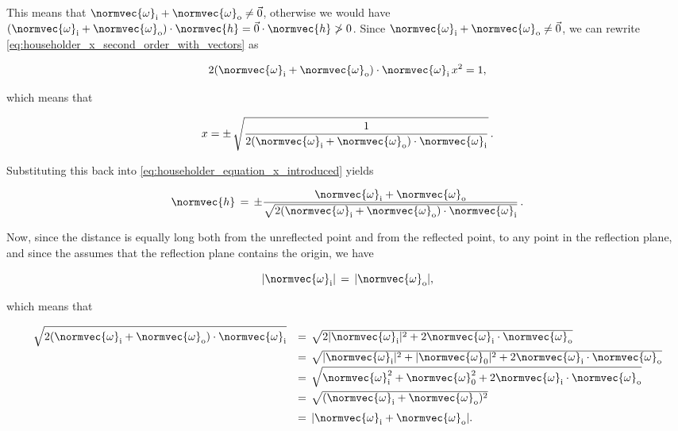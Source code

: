 This means that $\normvec{\omega}_{\text{i}} + \normvec{\omega}_{\text{o}} \neq \vec{0}$, otherwise we would have $(\normvec{\omega}_{\text{i}} + \normvec{\omega}_{\text{o}})\cdot\normvec{h} = \vec{0}\cdot\normvec{h} \not > 0$. Since $\normvec{\omega}_{\text{i}} + \normvec{\omega}_{\text{o}} \neq \vec{0}$, we can rewrite \eqref{eq:householder_x_second_order_with_vectors} as

\begin{equation}
2(\normvec{\omega}_{\text{i}} + \normvec{\omega}_{\text{o}})\cdot\normvec{\omega}_{\text{i}}\,x^2 = 1,
\end{equation}

which means that

\begin{equation}
x = \pm\,\sqrt{\frac{1}{2(\normvec{\omega}_{\text{i}} + \normvec{\omega}_{\text{o}})\cdot\normvec{\omega}_{\text{i}}}}\,.
\end{equation}

Substituting this back into \eqref{eq:householder_equation_x_introduced} yields

\begin{equation} \label{eq:householder_equation_x_replaced}
\normvec{h} \,=\, \pm\frac{\normvec{\omega}_{\text{i}} + \normvec{\omega}_{\text{o}}}{\sqrt{2(\normvec{\omega}_{\text{i}} + \normvec{\omega}_{\text{o}})\cdot\normvec{\omega}_{\text{i}}}}\,.
\end{equation}

Now, since the distance is equally long both from the unreflected point and from the reflected point, to any point in the reflection plane, and since the  assumes that the reflection plane contains the origin, we have

\begin{equation}
|\normvec{\omega}_{\text{i}}| \,=\, |\normvec{\omega}_{\text{o}}|,
\end{equation}

which means that

\begin{equation}
\renewcommand*{\arraystretch}{1.5}
\begin{array}{rl}
\displaystyle \sqrt{2(\normvec{\omega}_{\text{i}} + \normvec{\omega}_{\text{o}})\cdot\normvec{\omega}_{\text{i}}} & =\, \sqrt{2|\normvec{\omega}_{\text{i}}|^2 + 2\normvec{\omega}_{\text{i}}\cdot \normvec{\omega}_{\text{o}}} \\
\displaystyle & =\, \sqrt{|\normvec{\omega}_{\text{i}}|^2 + |\normvec{\omega}_{\text{0}}|^2 + 2\normvec{\omega}_{\text{i}}\cdot \normvec{\omega}_{\text{o}}} \\
\displaystyle & =\, \sqrt{\normvec{\omega}_{\text{i}}^2 + \normvec{\omega}_{\text{0}}^2 + 2\normvec{\omega}_{\text{i}}\cdot \normvec{\omega}_{\text{o}}} \\
\displaystyle & =\, \sqrt{(\normvec{\omega}_{\text{i}}+\normvec{\omega}_{\text{o}})^2} \\
\displaystyle & =\, |\normvec{\omega}_{\text{i}}+\normvec{\omega}_{\text{o}}|.
\end{array}
\end{equation}

